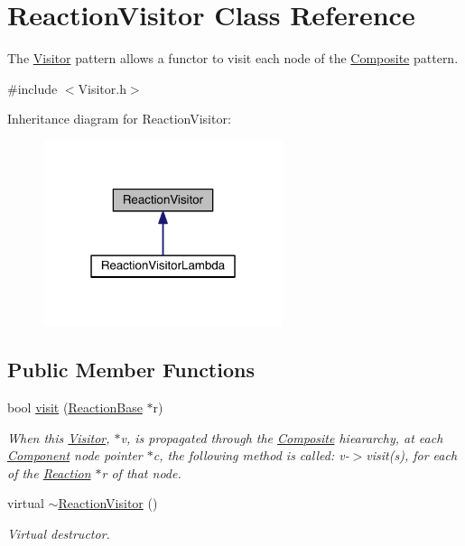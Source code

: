 \hypertarget{classReactionVisitor}{\section{Reaction\+Visitor Class Reference}
\label{classReactionVisitor}
}


The \hyperlink{classVisitor}{Visitor} pattern allows a functor to visit each node of the \hyperlink{classComposite}{Composite} pattern.  




{\ttfamily \#include $<$Visitor.\+h$>$}



Inheritance diagram for Reaction\+Visitor\+:\nopagebreak
\begin{figure}[H]
\begin{center}
\leavevmode
\includegraphics[width=199pt]{classReactionVisitor__inherit__graph}
\end{center}
\end{figure}
\subsection*{Public Member Functions}
\begin{DoxyCompactItemize}
\item 
bool \hyperlink{classReactionVisitor_a2a2381f0f0fcd0067537af8d965a32d3}{visit} (\hyperlink{classReactionBase}{Reaction\+Base} $\ast$r)
\begin{DoxyCompactList}\small\item\em When this \hyperlink{classVisitor}{Visitor}, $\ast$v, is propagated through the \hyperlink{classComposite}{Composite} hieararchy, at each \hyperlink{classComponent}{Component} node pointer $\ast$c, the following method is called\+: v-\/$>$visit(s), for each of the \hyperlink{classReaction}{Reaction} $\ast$r of that node. \end{DoxyCompactList}\item 
virtual \hyperlink{classReactionVisitor_a4d310d3c9165de0c33fc37e37406c242}{$\sim$\+Reaction\+Visitor} ()
\begin{DoxyCompactList}\small\item\em Virtual destructor. \end{DoxyCompactList}\end{DoxyCompactItemize}
